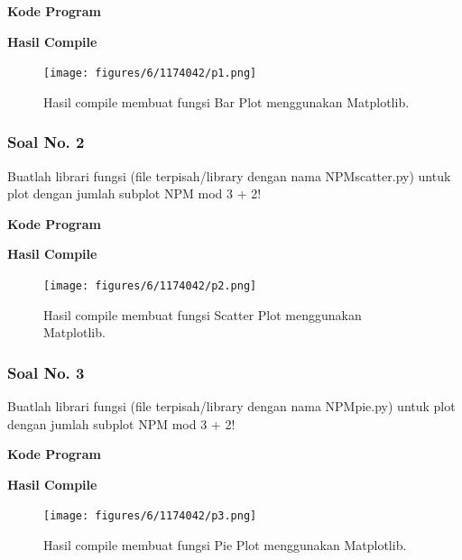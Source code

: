 \hfill \break
\textbf{Kode Program}



\hfill \break
\textbf{Hasil Compile}

\begin{figure}[H]
	\texttt{[image: figures/6/1174042/p1.png]}
	\centering
	\caption{Hasil compile membuat fungsi Bar Plot menggunakan Matplotlib.}
\end{figure}

\subsubsection{Soal No. 2}
\hfill \break
Buatlah librari fungsi (file terpisah/library dengan nama NPMscatter.py) untuk plot dengan jumlah subplot NPM mod 3 + 2!

\hfill \break
\textbf{Kode Program}



\hfill \break
\textbf{Hasil Compile}

\begin{figure}[H]
	\texttt{[image: figures/6/1174042/p2.png]}
	\centering
	\caption{Hasil compile membuat fungsi Scatter Plot menggunakan Matplotlib.}
\end{figure}

\subsubsection{Soal No. 3}
\hfill \break
Buatlah librari fungsi (file terpisah/library dengan nama NPMpie.py) untuk plot dengan jumlah subplot NPM mod 3 + 2!

\hfill \break
\textbf{Kode Program}



\hfill \break
\textbf{Hasil Compile}

\begin{figure}[H]
	\texttt{[image: figures/6/1174042/p3.png]}
	\centering
	\caption{Hasil compile membuat fungsi Pie Plot menggunakan Matplotlib.}
\end{figure}

